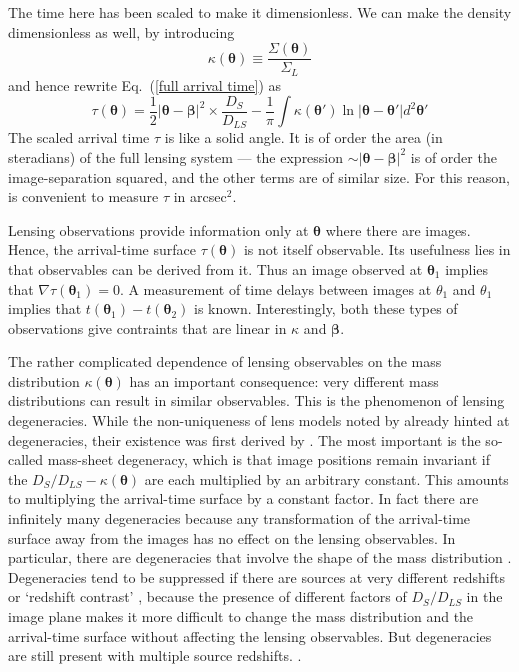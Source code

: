 \documentclass[galley,usenatbib]{mn2e}
\newcommand{\eqnref}[1] {Eq.~(\ref{#1})}
\renewcommand{\vec}[1]{\ensuremath{\boldsymbol{#1}}}
\begin{document}
The time here has been scaled to make it dimensionless.  We can make
the density dimensionless as well, by introducing
\begin{equation}
\kappa(\vec\theta) \equiv \frac{\Sigma(\vec\theta)}{\Sigma_L}
\end{equation}
and hence rewrite \eqnref{full arrival time} as
\begin{equation}
\tau(\vec\theta) = {\textstyle\frac12} |\vec\theta - \vec\beta|^2
                   \times \frac{D_{S}}{D_{LS}}
                 - \frac1\pi \int \kappa (\vec\theta')
                   \ln|\vec\theta - \vec\theta'| d^2\vec\theta'
\label{arrival time}
\end{equation}
The scaled arrival time $\tau$ is like a solid angle.  It is of order
the area (in steradians) of the full lensing system --- the expression
$\sim|\vec\theta - \vec\beta|^2$ is of order the image-separation
squared, and the other terms are of similar size.  For this reason, is
convenient to measure $\tau$ in arcsec$^{2}$.

Lensing observations provide information only at $\vec\theta$ where
there are images.  Hence, the arrival-time surface $\tau(\vec\theta)$
is not itself observable.  Its usefulness lies in that observables can
be derived from it.  Thus an image observed at $\vec\theta_1$ implies
that $\nabla\tau(\vec\theta_1)=0$.  A measurement of time delays
between images at $\theta_1$ and $\theta_1$ implies that
$t(\vec\theta_1)-t(\vec\theta_2)$ is known.  Interestingly, both these
types of observations give contraints that are linear in $\kappa$ and
$\vec\beta$.

The rather complicated dependence of lensing observables on the mass
distribution $\kappa(\vec\theta)$ has an important consequence: very
different mass distributions can result in similar observables.  This
is the phenomenon of lensing degeneracies.  While the non-uniqueness
of lens models noted by \cite{1981ApJ...244..736Y} already hinted at
degeneracies, their existence was first derived by
\cite{1985ApJ...289L...1F}.  The most important is the so-called
mass-sheet degeneracy, which is that image positions remain invariant
if the $D_S/D_{LS} - \kappa(\vec\theta)$ are each multiplied by an
arbitrary constant.  This amounts to multiplying the arrival-time
surface by a constant factor.  In fact there are infinitely many
degeneracies \citep{2000AJ....120.1654S} because any transformation of
the arrival-time surface away from the images has no effect on the
lensing observables.  In particular, there are degeneracies that
involve the shape of the mass distribution
\citep{2006ApJ...653..936S,2013arXiv1306.4675S}.  Degeneracies tend to
be suppressed if there are sources at very different redshifts or
`redshift contrast' \citep{1998AJ....116.1541A,2009ApJ...690..154S},
because the presence of different factors of $D_S/D_{LS}$ in the image
plane makes it more difficult to change the mass distribution and the
arrival-time surface without affecting the lensing observables.  But
degeneracies are still present with multiple source redshifts.
\citep{2008MNRAS.386..307L}.
\end{document}
